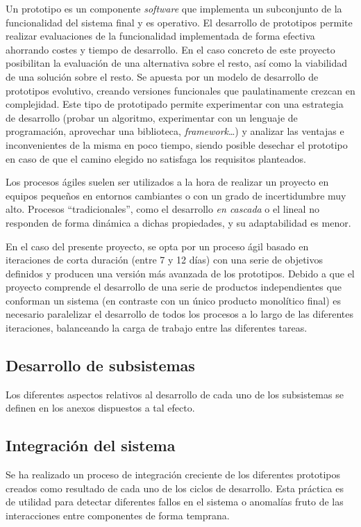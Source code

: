 Un prototipo es un componente \textit{software} que implementa un subconjunto de la funcionalidad del sistema final y es operativo. El desarrollo de prototipos permite realizar evaluaciones de la funcionalidad implementada de forma efectiva ahorrando costes y tiempo de desarrollo. En el caso concreto de este proyecto posibilitan la evaluación de una alternativa sobre el resto, así como la viabilidad de una solución sobre el resto. Se apuesta por un modelo de desarrollo de prototipos evolutivo\cite{10.1109/TSE.1975.6312870}, creando versiones funcionales que paulatinamente crezcan en complejidad. Este tipo de prototipado permite experimentar con una estrategia de desarrollo (probar un algoritmo, experimentar con un lenguaje de programación, aprovechar una biblioteca, \textit{framework}\dots) y analizar las ventajas e inconvenientes de la misma en poco tiempo, siendo posible desechar el prototipo en caso de que el camino elegido no satisfaga los requisitos planteados.

Los procesos ágiles suelen ser utilizados a la hora de realizar un proyecto en equipos pequeños en entornos cambiantes o con un grado de incertidumbre muy alto. Procesos ``tradicionales'', como el desarrollo \textit{en cascada} o el lineal no responden de forma dinámica a dichas propiedades, y su adaptabilidad es menor.

En el caso del presente proyecto, se opta por un proceso ágil basado en iteraciones de corta duración (entre 7 y 12 días) con una serie de objetivos definidos y producen una versión más avanzada de los prototipos. Debido a que el proyecto comprende el desarrollo de una serie de productos independientes que conforman un sistema (en contraste con un único producto monolítico final) es necesario paralelizar el desarrollo de todos los procesos a lo largo de las diferentes iteraciones, balanceando la carga de trabajo entre las diferentes tareas.

\subsection{Desarrollo de subsistemas}
Los diferentes aspectos relativos al desarrollo de cada uno de los subsistemas se definen en los anexos dispuestos a tal efecto.

\subsection{Integración del sistema}

Se ha realizado un proceso de integración creciente de los diferentes prototipos creados como resultado de cada uno de los ciclos de desarrollo. Esta práctica es de utilidad para detectar diferentes fallos en el sistema o anomalías fruto de las interacciones entre componentes de forma temprana.

